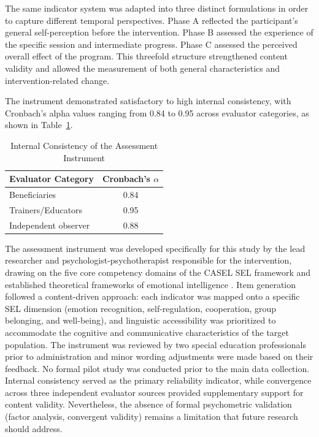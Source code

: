 \documentclass[12pt,a4paper]{article}
\begin{document}
The same indicator system was adapted into three distinct formulations in order to capture different temporal perspectives. Phase A reflected the participant's general self-perception before the intervention. Phase B assessed the experience of the specific session and intermediate progress. Phase C assessed the perceived overall effect of the program. This threefold structure strengthened content validity and allowed the measurement of both general characteristics and intervention-related change.

The instrument demonstrated satisfactory to high internal consistency, with Cronbach's alpha values ranging from 0.84 to 0.95 across evaluator categories, as shown in Table~\ref{tab:cronbach}.

\begin{table}[!t]
\caption{Internal Consistency of the Assessment Instrument}
\label{tab:cronbach}
\centering
\begin{tabular}{lc}
\hline
\textbf{Evaluator Category} & \textbf{Cronbach's $\alpha$} \\
\hline
Beneficiaries & 0.84 \\
Trainers/Educators & 0.95 \\
Independent observer & 0.88 \\
\hline
\end{tabular}
\end{table}

The assessment instrument was developed specifically for this study
by the lead researcher and psychologist-psychotherapist responsible
for the intervention, drawing on the five core competency domains
of the CASEL SEL framework \citep{casel2020} and established
theoretical frameworks of emotional intelligence \citep{goleman1995}.
Item generation followed a content-driven approach: each indicator
was mapped onto a specific SEL dimension (emotion recognition,
self-regulation, cooperation, group belonging, and well-being),
and linguistic accessibility was prioritized to accommodate the
cognitive and communicative characteristics of the target population.
The instrument was reviewed by two special education professionals
prior to administration and minor wording adjustments were made
based on their feedback. No formal pilot study was conducted prior
to the main data collection. Internal consistency served as the
primary reliability indicator, while convergence across three
independent evaluator sources provided supplementary support for
content validity. Nevertheless, the absence of formal psychometric
validation (factor analysis, convergent validity) remains a
limitation that future research should address.
\end{document}
